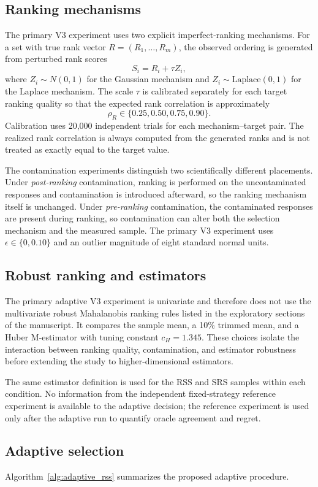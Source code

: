 \documentclass[12pt]{article}
\begin{document}
\subsection{Ranking mechanisms}
The primary V3 experiment uses two explicit imperfect-ranking mechanisms. For a set with true rank vector $R=(R_1,\ldots,R_m)$, the observed ordering is generated from perturbed rank scores
\[
S_i = R_i + \tau Z_i,
\]
where $Z_i\sim N(0,1)$ for the Gaussian mechanism and $Z_i\sim \mathrm{Laplace}(0,1)$ for the Laplace mechanism. The scale $\tau$ is calibrated separately for each target ranking quality so that the expected rank correlation is approximately
\[
\rho_R\in\{0.25,0.50,0.75,0.90\}.
\]
Calibration uses 20,000 independent trials for each mechanism--target pair. The realized rank correlation is always computed from the generated ranks and is not treated as exactly equal to the target value.

The contamination experiments distinguish two scientifically different placements. Under \emph{post-ranking} contamination, ranking is performed on the uncontaminated responses and contamination is introduced afterward, so the ranking mechanism itself is unchanged. Under \emph{pre-ranking} contamination, the contaminated responses are present during ranking, so contamination can alter both the selection mechanism and the measured sample. The primary V3 experiment uses $\epsilon\in\{0,0.10\}$ and an outlier magnitude of eight standard normal units.

\subsection{Robust ranking and estimators}
The primary adaptive V3 experiment is univariate and therefore does not use the multivariate robust Mahalanobis ranking rules listed in the exploratory sections of the manuscript. It compares the sample mean, a 10\% trimmed mean, and a Huber M-estimator with tuning constant $c_H=1.345$. These choices isolate the interaction between ranking quality, contamination, and estimator robustness before extending the study to higher-dimensional estimators.

The same estimator definition is used for the RSS and SRS samples within each condition. No information from the independent fixed-strategy reference experiment is available to the adaptive decision; the reference experiment is used only after the adaptive run to quantify oracle agreement and regret.

\subsection{Adaptive selection}
Algorithm~\ref{alg:adaptive_rss} summarizes the proposed adaptive procedure.
\end{document}
